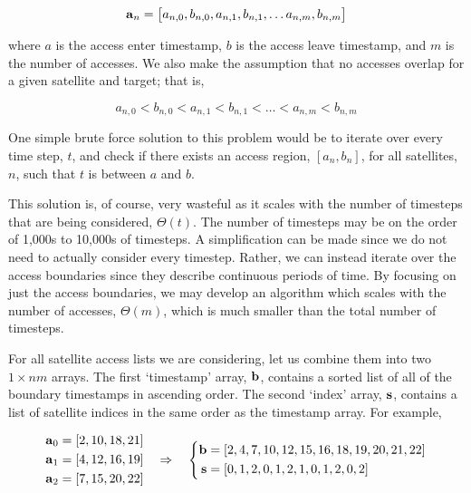 \begin{equation}\label{eq:access-list} 
    \bm{\mathrm{a}}_{n} = \left[ a_{n,0}, b_{n,0}, a_{n,1}, b_{n,1}, \ldots a_{n,m}, b_{n,m} \right]
\end{equation}


where $a$ is the access enter timestamp, $b$ is the access leave timestamp, and
$m$ is the number of accesses. We also make the assumption that no accesses
overlap for a given satellite and target; that is,

\begin{equation}\label{eq:access-list-constraint}
    a_{n,0} < b_{n,0} < a_{n,1} < b_{n,1} < \ldots < a_{n,m} < b_{n,m}
\end{equation}

One simple brute force solution to this problem would be to iterate over every
time step, $t$, and check if there exists an access region, $[a_n,b_n]$, for all
satellites, $n$, such that $t$ is between $a$ and $b$.

This solution is, of course, very wasteful as it scales with the number of
timesteps that are being considered, $\Theta(t)$. The number of timesteps may
be on the order of 1,000s to 10,000s of timesteps. A simplification can be made
since we do not need to actually consider every timestep. Rather, we can
instead iterate over the access boundaries since they describe continuous
periods of time. By focusing on just the access boundaries, we may develop an
algorithm which scales with the number of accesses, $\Theta(m)$, which is much
smaller than the total number of timesteps.

For all satellite access lists we are considering, let us combine them into two
$1\times nm$ arrays. The first `timestamp' array, $\bm{\mathrm{b}}$, contains a sorted
list of all of the boundary timestamps in ascending order. The second `index'
array, $\bm{\mathrm{s}}$, contains a list of satellite indices in the same order as the
timestamp array. For example,

\begin{equation*}
    \begin{aligned} 
	\bm{\mathrm{a}}_{0} &= \left[ 2, 10, 18, 21  \right] \\
	\bm{\mathrm{a}}_{1} &= \left[ 4, 12, 16, 19  \right] \\
	\bm{\mathrm{a}}_{2} &= \left[ 7, 15, 20, 22  \right] \\
    \end{aligned}
    \quad \Rightarrow \quad
    \left \{ 
	\begin{aligned}
	    \bm{\mathrm{b}} &= [ 2 , 4 , 7 , 10 , 12 , 15 , 16 , 18 , 19 , 20 , 21 , 22  ] \\
	    \bm{\mathrm{s}} &= [ 0 , 1 , 2 , 0 , 1 , 2 , 1 , 0 , 1 , 2 , 0 , 2  ]
	\end{aligned}
    \right.
\end{equation*}

